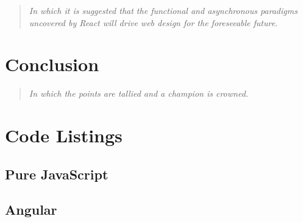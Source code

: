 \documentclass[12pt,letterpaper]{article}
\begin{document}
\begin{quote}
	\singlespacing
	\emph{In which it is suggested that the functional and asynchronous paradigms uncovered by React will drive web design for the foreseeable future.}
\end{quote}




\section{Conclusion}
\vspace{-12pt}

\begin{quote}
	\singlespacing
	\emph{In which the points are tallied and a champion is crowned.}
\end{quote}










\newpage

\appendix
\section{Code Listings}
\label{app:code}

\subsection*{Pure JavaScript}




\newpage

\subsection*{Angular}
\end{document}
